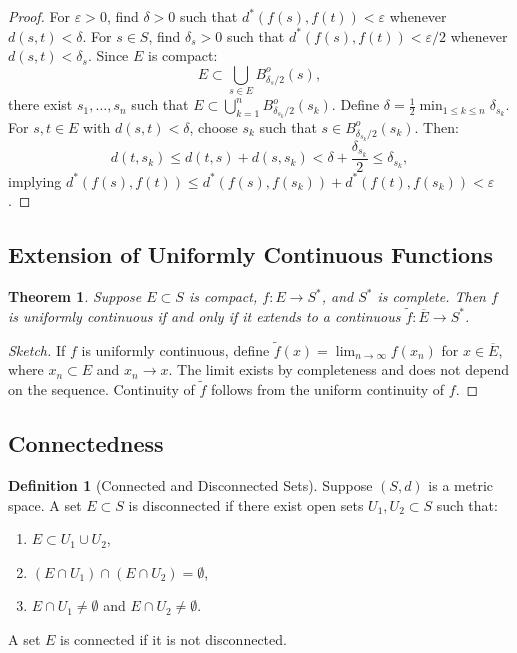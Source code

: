 \documentclass[9pt]{article}
\theoremstyle{definition}
\newtheorem{definition}{Definition}
\theoremstyle{plain}
\newtheorem{theorem}{Theorem}
\begin{document}
\begin{proof}
For \( \varepsilon > 0 \), find \( \delta > 0 \) such that \( d^*(f(s), f(t)) < \varepsilon \) whenever \( d(s, t) < \delta \). For \( s \in S \), find \( \delta_s > 0 \) such that \( d^*(f(s), f(t)) < \varepsilon/2 \) whenever \( d(s, t) < \delta_s \). Since \( E \) is compact:
\[
E \subset \bigcup_{s \in E} B_{\delta_s/2}^o(s),
\]
there exist \( s_1, \ldots, s_n \) such that \( E \subset \bigcup_{k=1}^n B_{\delta_{s_k}/2}^o(s_k) \). Define \( \delta = \frac{1}{2} \min_{1 \leq k \leq n} \delta_{s_k} \). For \( s, t \in E \) with \( d(s, t) < \delta \), choose \( s_k \) such that \( s \in B_{\delta_{s_k}/2}^o(s_k) \). Then:
\[
d(t, s_k) \leq d(t, s) + d(s, s_k) < \delta + \frac{\delta_{s_k}}{2} \leq \delta_{s_k},
\]
implying \( d^*(f(s), f(t)) \leq d^*(f(s), f(s_k)) + d^*(f(t), f(s_k)) < \varepsilon \).
\end{proof}

\subsection*{Extension of Uniformly Continuous Functions}
\begin{theorem}
Suppose \( E \subset S \) is compact, \( f : E \to S^* \), and \( S^* \) is complete. Then \( f \) is uniformly continuous if and only if it extends to a continuous \( \tilde{f} : \overline{E} \to S^* \).
\end{theorem}

\begin{proof}[Sketch]
If \( f \) is uniformly continuous, define \( \tilde{f}(x) = \lim_{n \to \infty} f(x_n) \) for \( x \in \overline{E} \), where \( x_n \subset E \) and \( x_n \to x \). The limit exists by completeness and does not depend on the sequence. Continuity of \( \tilde{f} \) follows from the uniform continuity of \( f \).
\end{proof}

\subsection*{Connectedness}
\begin{definition}[Connected and Disconnected Sets]
Suppose \( (S, d) \) is a metric space. A set \( E \subset S \) is disconnected if there exist open sets \( U_1, U_2 \subset S \) such that:
\begin{enumerate}
    \item \( E \subset U_1 \cup U_2 \),
    \item \( (E \cap U_1) \cap (E \cap U_2) = \emptyset \),
    \item \( E \cap U_1 \neq \emptyset \) and \( E \cap U_2 \neq \emptyset \).
\end{enumerate}
A set \( E \) is connected if it is not disconnected.
\end{definition}
\end{document}
